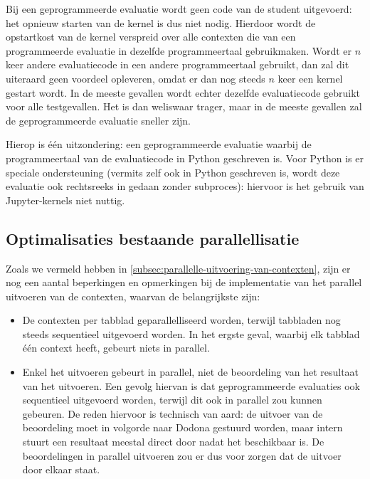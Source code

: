Bij een geprogrammeerde evaluatie wordt geen code van de student uitgevoerd: het opnieuw starten van de kernel is dus niet nodig.
Hierdoor wordt de opstartkost van de kernel verspreid over alle contexten die van een programmeerde evaluatie in dezelfde programmeertaal gebruikmaken.
Wordt er $n$ keer andere evaluatiecode in een andere programmeertaal gebruikt, dan zal dit uiteraard geen voordeel opleveren, omdat er dan nog steeds $n$ keer een kernel gestart wordt.
In de meeste gevallen wordt echter dezelfde evaluatiecode gebruikt voor alle testgevallen.
Het  is dan weliswaar trager, maar in de meeste gevallen zal de geprogrammeerde evaluatie sneller zijn.

Hierop is één uitzondering: een geprogrammeerde evaluatie waarbij de programmeertaal van de evaluatiecode in Python geschreven is.
Voor Python is er speciale ondersteuning (vermits \tested{} zelf ook in Python geschreven is, wordt deze evaluatie ook rechtsreeks in \tested{} gedaan zonder subproces): hiervoor is het gebruik van Jupyter-kernels niet nuttig.

\subsection{Optimalisaties bestaande parallellisatie}\label{subsec:optimalisaties-bestaande-parallellisatie}

Zoals we vermeld hebben in \cref{subsec:parallelle-uitvoering-van-contexten}, zijn er nog een aantal beperkingen en opmerkingen bij de implementatie van het parallel uitvoeren van de contexten, waarvan de belangrijkste zijn:

\begin{itemize}
    \item De contexten per tabblad geparallelliseerd worden, terwijl tabbladen nog steeds sequentieel uitgevoerd worden.
    In het ergste geval, waarbij elk tabblad één context heeft, gebeurt niets in parallel.
    \item Enkel het uitvoeren gebeurt in parallel, niet de beoordeling van het resultaat van het uitvoeren.
    Een gevolg hiervan is dat geprogrammeerde evaluaties ook sequentieel uitgevoerd worden, terwijl dit ook in parallel zou kunnen gebeuren.
    De reden hiervoor is technisch van aard: de uitvoer van de beoordeling moet in volgorde naar Dodona gestuurd worden, maar intern stuurt \tested{} een resultaat meestal direct door nadat het beschikbaar is.
    De beoordelingen in parallel uitvoeren zou er dus voor zorgen dat de uitvoer door elkaar staat.
\end{itemize}

